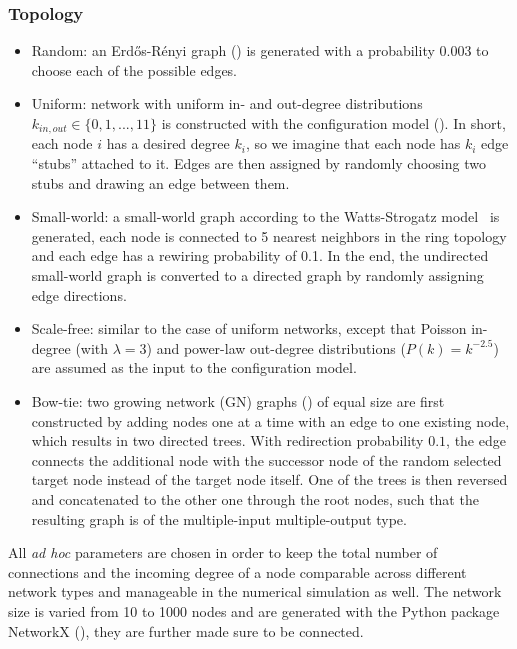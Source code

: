 \subsubsection{Topology}
\begin{itemize}
\item Random: an Erd\H{o}s-R\'enyi graph (\citealp{Erdos1959}) is generated with a probability
  $0.003$ to choose each of the possible edges.
\item Uniform: network with uniform in- and out-degree distributions $k_{in,out} \in 
  \{0,1,...,11\}$ is constructed 
  with the configuration model (\citealp{Newman2001}). 
  In short, each node $i$ has a desired degree $k_i$, 
  so we imagine that each node has $k_i$ edge ``stubs'' attached to it. Edges are 
  then assigned by randomly choosing two stubs and drawing an edge between them.
\item Small-world: a small-world graph  
according to the 
Watts-Strogatz model~\citep{Watts1998} is generated, 
each node is connected
to 5 nearest neighbors in the ring topology and each edge
has a rewiring probability of 0.1. In the end, the 
undirected small-world graph is converted to a directed
graph by randomly assigning edge directions.
\item Scale-free: similar to the case of uniform networks,
except that Poisson in-degree (with $\lambda = 3$) and power-law 
  out-degree distributions ($P(k) = k^{-2.5}$) are assumed as the input
  to the configuration model.
\item Bow-tie: two growing network (GN) graphs 
  (\citealp{Krapivsky2001}) of equal size are first 
  constructed by adding nodes one at a time with an edge to one existing node, 
  which results in two directed trees. With redirection probability $0.1$, the edge
  connects the additional node with the successor node of the random selected target
  node instead of the target node itself. One of the trees is then reversed and 
  concatenated to the other one through the root nodes, such that the resulting
  graph is of the multiple-input multiple-output type.
\end{itemize}
All \emph{ad hoc} parameters are chosen in order to keep the total number of connections
and the incoming degree of a node comparable across different
network types and manageable in the numerical simulation 
as well.
The network size is varied from 10 to 1000 nodes and are generated with the Python package NetworkX 
(\citealp{Hagberg2008}), they are further made sure to be connected.

